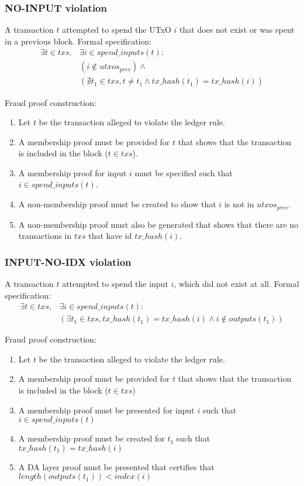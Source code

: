 \documentclass[../midgard.tex]{subfiles}
\begin{document}
\subsubsection{NO-INPUT violation}
\label{violation:NO-INPUT}
A transaction $t$ attempted to spend the UTxO $i$ that does not exist or was spent in a previous block.
Formal specification:
\begin{equation*}
\begin{split}
    \exists t \in txs, &\exists i \in spend\_inputs(t): \\
    &( i \notin utxos_{prev} ) \land  \\
    &( \nexists t_1 \in txs, t \neq t_1 \land tx\_hash(t_1) = tx\_hash(i) )
\end{split}
\end{equation*}

Fraud proof construction:
\begin{enumerate}
  \item Let $t$ be the transaction alleged to violate the ledger rule. 
  \item A membership proof must be provided for $t$ that shows that the transaction is included in the block ($t \in txs$).
  \item A membership proof for input $i$ must be specified such that $i \in spend\_inputs(t)$.
  \item A non-membership proof must be created to show that $i$ is not in $utxos_{prev}$.
  \item A non-membership proof must also be generated that shows that there are no transactions in $txs$ that have id $tx\_hash(i)$.
\end{enumerate}

\subsubsection{INPUT-NO-IDX violation}
\label{violation:INPUT-NO-IDX}
A transaction $t$ attempted to spend the input $i$, which did not exist at all.
Formal specification:
\begin{equation*}
\begin{split}
    \exists t \in txs, &\exists i \in spend\_inputs(t): \\
    &( \exists t_1 \in txs, tx\_hash(t_1) = tx\_hash(i) \land i \notin outputs(t_1) )
\end{split}
\end{equation*}

Fraud proof construction:
\begin{enumerate}
  \item Let $t$ be the transaction alleged to violate the ledger rule. 
  \item A membership proof must be provided for $t$ that shows that the transaction is included in the block ($t \in txs$)
  \item A membership proof must be presented for input $i$ such that $i \in spend\_inputs(t)$
  \item A membership proof must be created for $t_1$ such that $tx\_hash(t_1) = tx\_hash(i)$
  \item A DA layer proof must be presented that certifies that $length(outputs(t_1)) < index(i)$
\end{enumerate}
\end{document}
